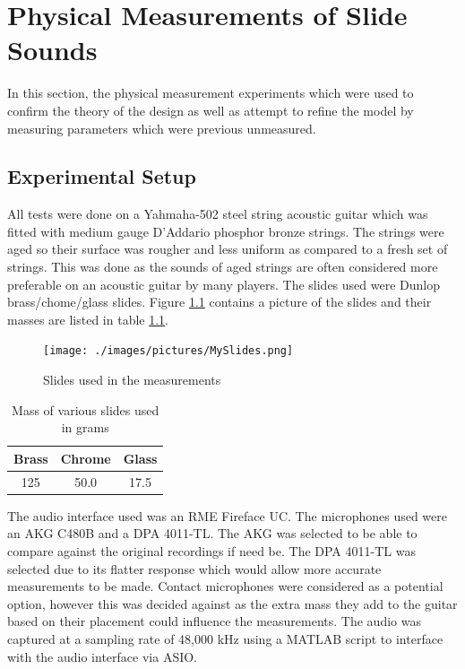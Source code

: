 \documentclass[../main.tex]{subfiles}
\begin{document}
\chapter{Physical Measurements of Slide Sounds}
In this section, the physical measurement experiments which were used to confirm the theory of the design as well as attempt to refine the model by measuring parameters which were previous unmeasured.

\section{Experimental Setup}
All tests were done on a Yahmaha-502 steel string acoustic guitar which was fitted with medium gauge D'Addario phosphor bronze strings. The strings were aged so their surface was rougher and less uniform as compared to a fresh set of strings. This was done as the sounds of aged strings are often considered more preferable on an acoustic guitar by many players. The slides used were Dunlop brass/chome/glass slides. Figure \ref{fig:MySlides} contains a picture of the slides and their masses are listed in table \ref{tab:SlideMass}.

\begin{figure}[h]
    \centering
    \texttt{[image: ./images/pictures/MySlides.png]}
    \caption{Slides used in the measurements}
    \label{fig:MySlides}
\end{figure}

\begin{table}[h]
\centering
\begin{tabular}{|c| c| c|} 
 \hline
 \textbf{Brass} & \textbf{Chrome} & \textbf{Glass} \\ [0.5ex] 
 \hline
 125 & 50.0 & 17.5 \\ 
 \hline
\end{tabular}
\caption{Mass of various slides used in grams}
\label{tab:SlideMass}
\end{table}

The audio interface used was an RME Fireface UC. The microphones used were an AKG C480B and a DPA 4011-TL. The AKG was selected to be able to compare against the original recordings if need be. The DPA 4011-TL was selected due to its flatter response which would allow more accurate measurements to be made. Contact microphones were considered as a potential option, however this was decided against as the extra mass they add to the guitar based on their placement could influence the measurements. The audio was captured at a sampling rate of 48,000 kHz using a MATLAB script to interface with the audio interface via ASIO.
\end{document}
